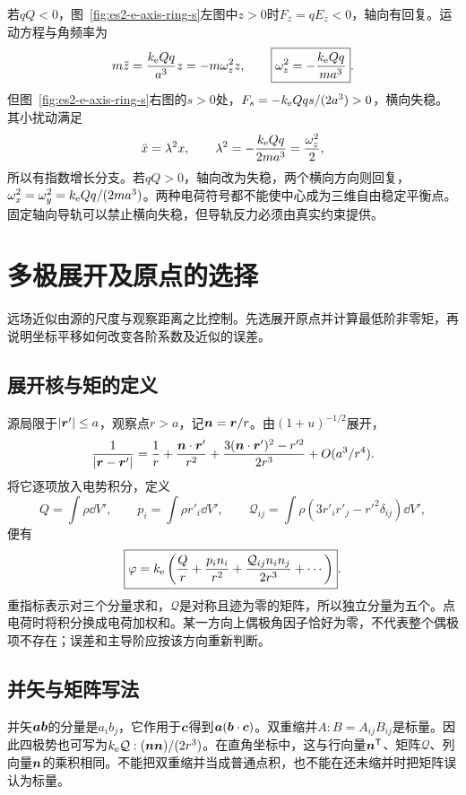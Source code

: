 \begin{solution}
若$qQ<0$，图~\ref{fig:es2-e-axis-ring-s}左图中$z>0$时$F_z=qE_z<0$，轴向有回复。运动方程与角频率为
\[m\ddot z=\frac{k_{\rm e} Qq}{a^3}z=-m\omega_z^2z,
\qquad \boxed{\omega_z^2=-\frac{k_{\rm e} Qq}{ma^3}}.
\]
但图~\ref{fig:es2-e-axis-ring-s}右图的$s>0$处，$F_s=-k_{\rm e} Qqs/(2a^3)>0$，横向失稳。其小扰动满足
\[\ddot x=\lambda^2x,\qquad
\lambda^2=-\frac{k_{\rm e} Qq}{2ma^3}=\frac{\omega_z^2}{2},
\]
所以有指数增长分支。若$qQ>0$，轴向改为失稳，两个横向方向则回复，$\omega_x^2=\omega_y^2=k_{\rm e} Qq/(2ma^3)$。两种电荷符号都不能使中心成为三维自由稳定平衡点。固定轴向导轨可以禁止横向失稳，但导轨反力必须由真实约束提供。

\end{solution}



\section{多极展开及原点的选择}\label{sec:es2-multipole}
远场近似由源的尺度与观察距离之比控制。先选展开原点并计算最低阶非零矩，再说明坐标平移如何改变各阶系数及近似的误差。

\subsection{展开核与矩的定义}
源局限于$|\bm{r}'|\le a$，观察点$r>a$，记$\bm{n}=\bm{r}/r$。由$(1+u)^{-1/2}$展开，
\[\frac1{|\bm{r}-\bm{r}'|}=\frac1r+\frac{\bm{n}\cdot\bm{r}'}{r^2}
+\frac{3(\bm{n}\cdot\bm{r}')^2-r'^2}{2r^3}+O(a^3/r^4).\]
将它逐项放入电势积分，定义
\[Q=\int\rho\dd V',\qquad p_i=\int\rho r'_i\dd V',\qquad
\mathcal Q_{ij}=\int\rho(3r'_ir'_j-r'^2\delta_{ij})\dd V',\]
便有
\[\boxed{\varphi=k_{\rm e}\left(\frac Qr+\frac{p_in_i}{r^2}
+\frac{\mathcal Q_{ij}n_in_j}{2r^3}+\cdots\right)}.\]
重指标表示对三个分量求和，$\mathcal Q$是对称且迹为零的矩阵，所以独立分量为五个。点电荷时将积分换成电荷加权和。某一方向上偶极角因子恰好为零，不代表整个偶极项不存在；误差和主导阶应按该方向重新判断。

\subsection{并矢与矩阵写法}
并矢$\bm{a}\bm{b}$的分量是$a_ib_j$，它作用于$\bm{c}$得到$\bm{a}(\bm{b}\cdot\bm{c})$。双重缩并$A:B=A_{ij}B_{ij}$是标量。因此四极势也可写为$k_{\rm e}\mathcal Q:(\bm{n}\bm{n})/(2r^3)$。在直角坐标中，这与行向量$\bm{n}^{\mathsf T}$、矩阵$\mathcal Q$、列向量$\bm{n}$的乘积相同。不能把双重缩并当成普通点积，也不能在还未缩并时把矩阵误认为标量。

